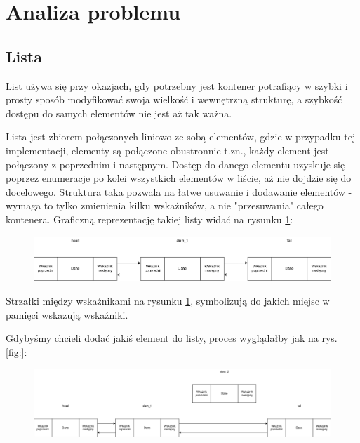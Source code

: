 \newpage
\section{Analiza problemu}		%

\subsection{Lista}

List używa się przy okazjach, gdy potrzebny jest kontener potrafiący w szybki i prosty sposób modyfikować swoja wielkość i wewnętrzną strukturę, a szybkość dostępu do samych elementów nie jest aż tak ważna.

Lista jest zbiorem połączonych liniowo ze sobą elementów, gdzie w przypadku tej implementacji, elementy są połączone obustronnie t.zn., każdy element jest połączony z poprzednim i następnym. Dostęp do danego elementu uzyskuje się poprzez enumeracje po kolei wszystkich elementów w liście, aż nie dojdzie się do docelowego. Struktura taka pozwala na łatwe usuwanie i dodawanie elementów - wymaga to tylko zmienienia kilku wskaźników, a nie "przesuwania" całego kontenera. Graficzną reprezentację takiej listy widać na rysunku \ref{fig:list_struct}:

\begin{figure}[H]
	\centering
	\includegraphics[width=1\textwidth]{images/lista.drawio.png}
	\caption{}
	\label{fig:list_struct}
\end{figure}

Strzałki między wskaźnikami na rysunku \ref{fig:list_struct}, symbolizują do jakich miejsc w pamięci wskazują wskaźniki.

Gdybyśmy chcieli dodać jakiś element do listy, proces wyglądałby jak na rys. \ref{fig:}:

\begin{figure}[H]
	\centering
	\includegraphics[width=1\textwidth]{images/listadodanie_pre.drawio.png}
	\caption{}
	\label{fig:list_add_pre}
\end{figure}

